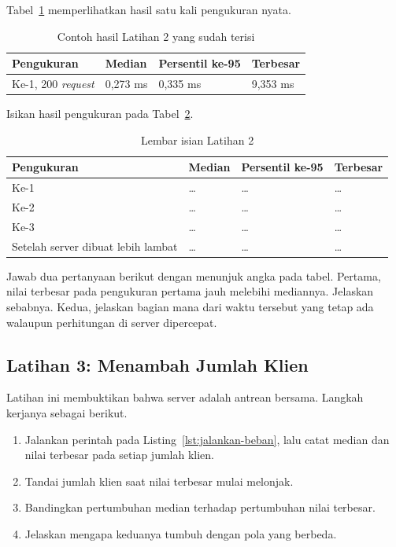 Tabel~\ref{tab:lat2cs-contoh} memperlihatkan hasil satu kali pengukuran nyata.

\begin{table}[htbp]
  \centering
  \caption{Contoh hasil Latihan 2 yang sudah terisi}
  \label{tab:lat2cs-contoh}
  \begin{tabularx}{\textwidth}{|X|l|l|l|}
    \hline
    \textbf{Pengukuran} & \textbf{Median} & \textbf{Persentil ke-95} & \textbf{Terbesar} \\
    \hline
    Ke-1, 200 \textit{request} & 0,273 ms & 0,335 ms & 9,353 ms \\
    \hline
  \end{tabularx}
\end{table}

Isikan hasil pengukuran pada Tabel~\ref{tab:lat2cs-hasil}.

\begin{table}[htbp]
  \centering
  \caption{Lembar isian Latihan 2}
  \label{tab:lat2cs-hasil}
  \begin{tabularx}{\textwidth}{|X|l|l|l|}
    \hline
    \textbf{Pengukuran} & \textbf{Median} & \textbf{Persentil ke-95} & \textbf{Terbesar} \\
    \hline
    Ke-1 & \dots & \dots & \dots \\
    \hline
    Ke-2 & \dots & \dots & \dots \\
    \hline
    Ke-3 & \dots & \dots & \dots \\
    \hline
    Setelah server dibuat lebih lambat & \dots & \dots & \dots \\
    \hline
  \end{tabularx}
\end{table}

Jawab dua pertanyaan berikut dengan menunjuk angka pada tabel. Pertama, nilai
terbesar pada pengukuran pertama jauh melebihi mediannya. Jelaskan sebabnya. Kedua, jelaskan bagian mana dari waktu tersebut yang tetap ada
walaupun perhitungan di server dipercepat.

\subsection*{Latihan 3: Menambah Jumlah Klien}

Latihan ini membuktikan bahwa server adalah antrean bersama. Langkah kerjanya
sebagai berikut.

\begin{enumerate}
  \item Jalankan perintah pada Listing~\ref{lst:jalankan-beban}, lalu catat median
    dan nilai terbesar pada setiap jumlah klien.
  \item Tandai jumlah klien saat nilai terbesar mulai melonjak.
  \item Bandingkan pertumbuhan median terhadap pertumbuhan nilai terbesar.
  \item Jelaskan mengapa keduanya tumbuh dengan pola yang berbeda.
\end{enumerate}

